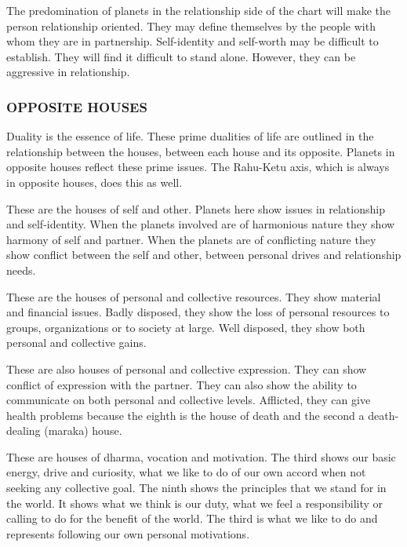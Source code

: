  

The predomination of planets in the relationship side of the chart will make the person relationship oriented. They may define themselves by the people with whom they are in partnership. Self-identity and self-worth may be difficult to establish. They will find it difficult to stand alone. However, they can be aggressive in relationship.

 

\subsubsection{OPPOSITE HOUSES}
 

Duality is the essence of life. These prime dualities of life are outlined in the relationship between the houses, between each house and its opposite. Planets in opposite houses reflect these prime issues. The Rahu-Ketu axis, which is always in opposite houses, does this as well.

 


 

These are the houses of self and other. Planets here show issues in relationship and self-identity. When the planets involved are of harmonious nature they show harmony of self and partner. When the planets are of conflicting nature they show conflict between the self and other, between personal drives and relationship needs.

 


 

These are the houses of personal and collective resources. They show material and financial issues. Badly disposed, they show the loss of personal resources to groups, organizations or to society at large. Well disposed, they show both personal and collective gains.

These are also houses of personal and collective expression. They can show conflict of expression with the partner. They can also show the ability to communicate on both personal and collective levels. Afflicted, they can give health problems because the eighth is the house of death and the second a death-dealing (maraka) house.

 


 

These are houses of dharma, vocation and motivation. The third shows our basic energy, drive and curiosity, what we like to do of our own accord when not seeking any collective goal. The ninth shows the principles that we stand for in the world. It shows what we think is our duty, what we feel a responsibility or calling to do for the benefit of the world. The third is what we like to do and represents following our own personal motivations.

